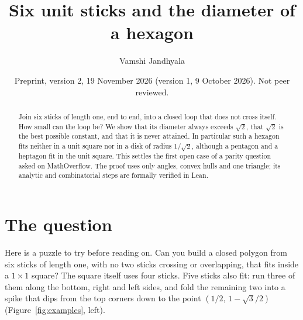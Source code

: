 \documentclass[11pt]{article}
\title{Six unit sticks and the diameter of a hexagon}
\author{Vamshi Jandhyala}
\date{Preprint, version 2, 19 November 2026 (version 1, 9 October 2026). Not peer reviewed.}
\theoremstyle{remark}
\begin{document}
\maketitle
\vspace{-2em}

\begin{abstract}
Join six sticks of length one, end to end, into a closed loop that does not cross itself.
How small can the loop be? We show that its diameter always exceeds $\sqrt2$, that
$\sqrt2$ is the best possible constant, and that it is never attained. In particular such a
hexagon fits neither in a unit square nor in a disk of radius $1/\sqrt2$, although a
pentagon and a heptagon fit in the unit square. This settles the first open case of a
parity question asked on MathOverflow. The proof uses only angles, convex hulls and one
triangle; its analytic and combinatorial steps are formally verified in Lean.
\end{abstract}

\section{The question}

Here is a puzzle to try before reading on. Can you build a closed polygon from six sticks
of length one, with no two sticks crossing or overlapping, that fits inside a $1\times1$
square? The square itself uses four sticks. Five sticks also fit: run three of them along
the bottom, right and left sides, and fold the remaining two into a spike that dips from
the top corners down to the point $(1/2,\,1-\sqrt3/2)$ (Figure~\ref{fig:examples}, left).
\end{document}
